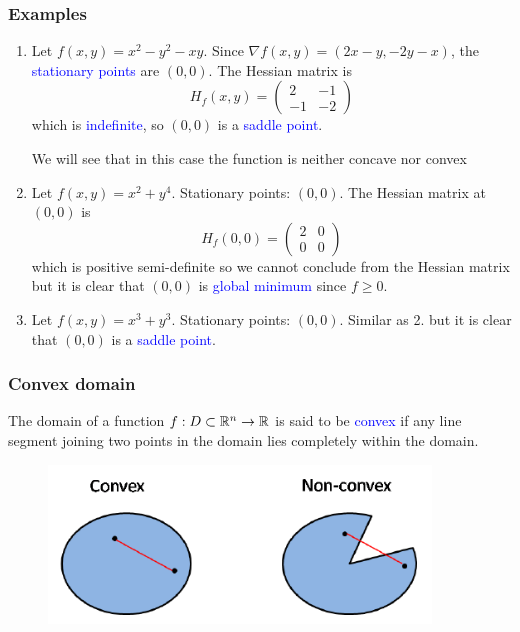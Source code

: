 \documentclass[11pt,aspectratio=169]{beamer}
\begin{document}
\begin{frame}
\frametitle{Examples}
\begin{small}
\begin{enumerate}

\item Let $f(x,y)=x^2-y^2-xy$. Since $\nabla f(x,y)=(2x-y, -2y-x)$, the \textcolor{blue}{stationary points} are $(0,0)$. The Hessian matrix is
\begin{equation*}
H_f(x,y)=\begin{pmatrix}
2 & -1 \\
-1 & -2
\end{pmatrix}
\end{equation*}
which is \textcolor{blue}{indefinite}, so $(0,0)$ is a \textcolor{blue}{saddle point}.

\begin{tiny} We will see that in this case the function is neither concave nor convex\end{tiny}

\item Let $f(x,y)=x^2+y^4$. Stationary points: $(0,0)$. The Hessian matrix at $(0,0)$ is
\begin{equation*}
H_f(0,0)=\begin{pmatrix}
2 & 0 \\
0 & 0
\end{pmatrix}
\end{equation*}
which is positive semi-definite
so we cannot conclude from the Hessian matrix but it is clear that $(0,0)$ is \textcolor{blue}{ global minimum} since $f \geq 0$.

\item Let $f(x,y)=x^3+y^3$. Stationary points: $(0,0)$. Similar as 2. but it is clear that $(0,0)$ is a \textcolor{blue}{saddle point}.
\end{enumerate}
\end{small}
\end{frame}




\begin{frame}
\frametitle{Convex domain}
\begin{small}
The domain of a function $f:D \subset \mathbb R^n \rightarrow \mathbb R$ is said to be \textcolor{blue}{convex} if any line segment joining two points in the domain lies completely within the domain.
\end{small}
\begin{figure}
\includegraphics[width=4in]{img/convex_set} 
\end{figure}
\end{frame}
\end{document}
